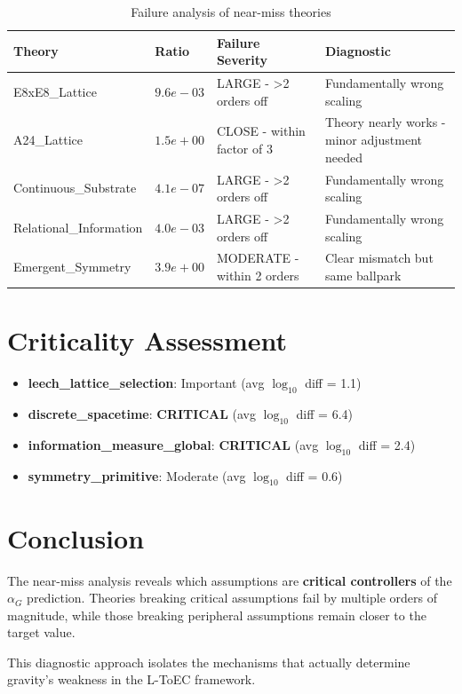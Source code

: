 \documentclass[11pt]{article}
\begin{document}
\begin{table}[h!]
\centering
\begin{tabular}{p{}p{}p{}p{}}
\toprule
\textbf{Theory} & \textbf{Ratio} & \textbf{Failure Severity} & \textbf{Diagnostic} \\
\midrule
E8xE8\_Lattice & $9.6e-03$ & LARGE - >2 orders off & Fundamentally wrong scaling \\
\midrule
A24\_Lattice & $1.5e+00$ & CLOSE - within factor of 3 & Theory nearly works - minor adjustment needed \\
\midrule
Continuous\_Substrate & $4.1e-07$ & LARGE - >2 orders off & Fundamentally wrong scaling \\
\midrule
Relational\_Information & $4.0e-03$ & LARGE - >2 orders off & Fundamentally wrong scaling \\
\midrule
Emergent\_Symmetry & $3.9e+00$ & MODERATE - within 2 orders & Clear mismatch but same ballpark \\
\bottomrule
\end{tabular}
\caption{Failure analysis of near-miss theories}
\end{table}

\section{Criticality Assessment}

\begin{itemize}
\item \textbf{leech\_lattice\_selection}: Important (avg $\log_10$ diff = 1.1)
\item \textbf{discrete\_spacetime}: \textbf{CRITICAL} (avg $\log_10$ diff = 6.4)
\item \textbf{information\_measure\_global}: \textbf{CRITICAL} (avg $\log_10$ diff = 2.4)
\item \textbf{symmetry\_primitive}: Moderate (avg $\log_10$ diff = 0.6)
\end{itemize}

\section*{Conclusion}

The near-miss analysis reveals which assumptions are \textbf{critical controllers}
of the $\alpha_G$ prediction. Theories breaking critical assumptions fail by
multiple orders of magnitude, while those breaking peripheral assumptions
remain closer to the target value.

This diagnostic approach isolates the mechanisms that actually determine
gravity's weakness in the L-ToEC framework.
\end{document}
